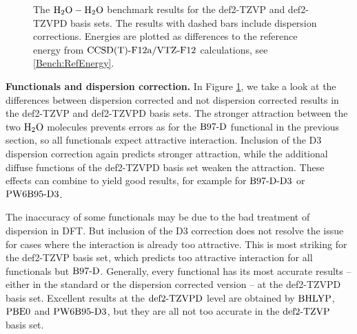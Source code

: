 \begin{figure}[b!]
\caption{The $\mbox{\ensuremath{\text H _2 \text O-\text H _2 \text O}}$ benchmark results for the def2-TZVP and def2-TZVPD basis sets.
The results with dashed bars include dispersion corrections. Energies are plotted as differences
to the reference energy from $\text{CCSD(T)-F12a}/\text{VTZ-F}12$ calculations, see \eqref{Bench:RefEnergy}.}
\label{Fig:Bench:H2O+H2O:TZVPCompare}
\end{figure}

\textbf{Functionals and dispersion correction.} In Figure
\ref{Fig:Bench:H2O+H2O:TZVPCompare}, we take a look at the differences between dispersion corrected and not dispersion
corrected results in the def2-TZVP and def2-TZVPD basis sets. The stronger
attraction between the two $\text H _2 \text O$ molecules prevents errors as for the
$\text{B97-D}$ functional in the previous section, so all functionals expect attractive
interaction. Inclusion of the D3 dispersion correction again predicts
stronger attraction, while the additional diffuse functions of the def2-TZVPD
basis set weaken the attraction. These effects can combine to yield good
results, for example for $\text{B97-D}\text{-D3}$ or $\text{PW6B95}\text{-D3}$.

The inaccuracy of some functionals may be due to the bad treatment of
dispersion in DFT. But inclusion of the D3 correction does not resolve the issue for cases
where the interaction is already too attractive. This
is most striking for the def2-TZVP basis set, which predicts too attractive
interaction for all functionals but $\text{B97-D}$. Generally, every functional has its
most accurate results -- either in the standard or the dispersion corrected version --
at the def2-TZVPD basis set. Excellent
results at the $\text{def2-TZVPD}$ level are obtained by $\text{BHLYP}$, $\text{PBE0}$ and $\text{PW6B95}\text{-D3}$,
but they are all not too accurate in the $\text{def2-TZVP}$ basis set.  

